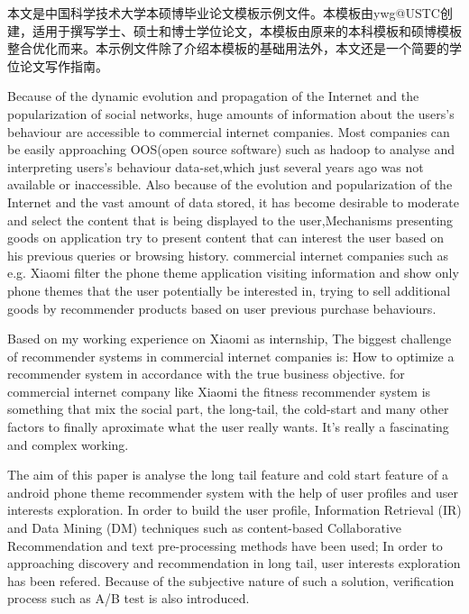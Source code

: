 \begin{cnabstract}
本文是中国科学技术大学本硕博毕业论文模板示例文件。本模板由ywg@USTC创建，适用于撰写学士、硕士和博士学位论文，本模板由原来的本科模板和硕博模板整合优化而来。本示例文件除了介绍本模板的基础用法外，本文还是一个简要的学位论文写作指南。

\end{cnabstract}

\begin{enabstract}
Because of the dynamic evolution and propagation of the Internet and the popularization of social networks, huge amounts of information about the users's behaviour are accessible to commercial internet companies. Most companies can be easily approaching OOS(open source software) such as hadoop to analyse and interpreting users's behaviour data-set,which just several years ago was not available or inaccessible. Also because of the evolution and popularization of the Internet and the vast amount of data stored, it has become desirable to moderate and select the content that is being displayed to the user,Mechanisms presenting goods on application try to present content that can interest the user based on his previous queries or browsing history. commercial internet companies such as e.g. Xiaomi filter the phone theme application visiting information and show only phone themes that the user potentially be interested in, trying to sell additional goods by recommender products based on user previous purchase behaviours.

Based on my working experience on Xiaomi as internship, The biggest challenge of recommender systems in commercial internet companies is: How to optimize a recommender system in accordance with the true business objective. for commercial internet company like Xiaomi the fitness recommender system is something that mix the social part, the long-tail, the cold-start and many other factors to finally aproximate what the user really wants. It's really a fascinating and complex working. 

The aim of this paper is analyse the long tail feature and cold start feature of a android phone theme recommender system with the help of user profiles and user interests exploration. In order to build the user profile, Information Retrieval (IR) and Data Mining (DM) techniques such as content-based Collaborative Recommendation and text pre-processing methods have been used; In order to approaching discovery and recommendation in long tail, user interests exploration has been refered. Because of the subjective nature of such a solution, verification process such as A/B test is also introduced.

\end{enabstract}
